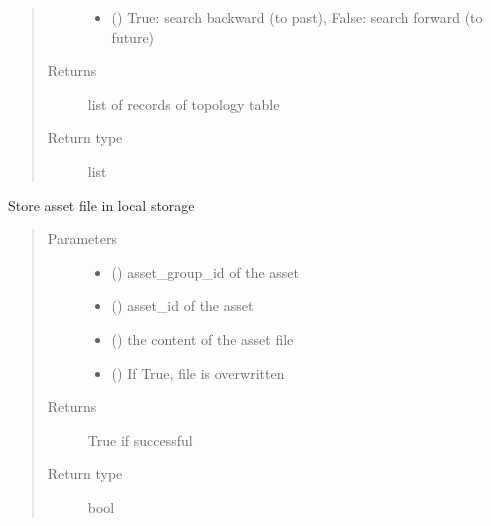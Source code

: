 \documentclass[letterpaper,10pt,english]{sphinxmanual}
\begin{document}
\begin{fulllineitems}
\begin{fulllineitems}
\begin{quote}
\begin{description}
\begin{itemize}
\item {} 
 () \textendash{} True: search backward (to past), False: search forward (to future)

\end{itemize}

\item[{Returns}] \leavevmode
list of records of topology table

\item[{Return type}] \leavevmode
list

\end{description}\end{quote}

\end{fulllineitems}


\begin{fulllineitems}
\label{\detokenize{bbc1.core.data_handler:bbc1.core.data_handler.DataHandler.store_in_storage}}
Store asset file in local storage
\begin{quote}\begin{description}
\item[{Parameters}] \leavevmode\begin{itemize}
\item {} 
 () \textendash{} asset\_group\_id of the asset

\item {} 
 () \textendash{} asset\_id of the asset

\item {} 
 () \textendash{} the content of the asset file

\item {} 
 () \textendash{} If True, file is overwritten

\end{itemize}

\item[{Returns}] \leavevmode
True if successful

\item[{Return type}] \leavevmode
bool

\end{description}\end{quote}

\end{fulllineitems}


\end{fulllineitems}
\end{document}
